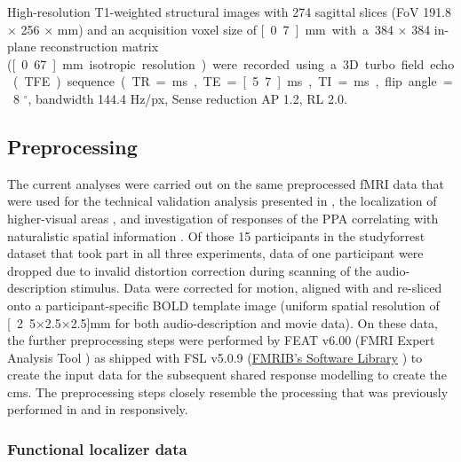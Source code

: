 %
High-resolution T1-weighted structural images with 274 sagittal slices (FoV
191.8 $\times$ 256 $\times$ \unit[256]{mm}) and an acquisition voxel size of
\unit[0.7]{mm} with a 384 $\times$ 384 in-plane reconstruction matrix
(\unit[0.67]{mm} isotropic resolution) were recorded using a 3D turbo field echo
(TFE) sequence (TR = \unit[2500]{ms}, TE = \unit[5.7]{ms}, TI = \unit[900]{ms},
flip angle = 8 $^{\circ}$, bandwidth 144.4 Hz/px, Sense reduction AP 1.2, RL
2.0.

\subsection{Preprocessing}


The current analyses were carried out on the same preprocessed fMRI data
\citep{hanke2016aligned} that were used for the technical validation analysis
presented in \citet{hanke2016simultaneous}, the localization of higher-visual
areas \citep{sengupta2016extension}, and investigation of responses of the PPA
correlating with naturalistic spatial information \citep{sengupta2016extension}.
Of those 15 participants in the studyforrest dataset that took part in all three
experiments, data of one participant were dropped due to invalid distortion
correction during scanning of the audio-description stimulus.
Data were corrected for motion, aligned with and re-sliced onto a
participant-specific BOLD template image \citep{sengupta2016extension} (uniform
spatial resolution of \unit[2.5$\times$2.5$\times$2.5]{mm} for both
audio-description and movie data).
On these data, the further preprocessing steps were performed by FEAT v6.00
(FMRI Expert Analysis Tool \citep{woolrich2001autocorr}) as shipped with FSL
v5.0.9 (\href{https://www.fmrib.ox.ac.uk/fsl}{FMRIB's Software Library}
\citep{smith2004fsl}) to create the input data for the subsequent shared
response modelling to create the \ac{cms}.
%
The preprocessing steps closely resemble the processing that was previously
performed in \citet{sengupta2016extension} and in \citet{haeusler2022processing}
responsively.

%

\subsubsection{Functional localizer data}

